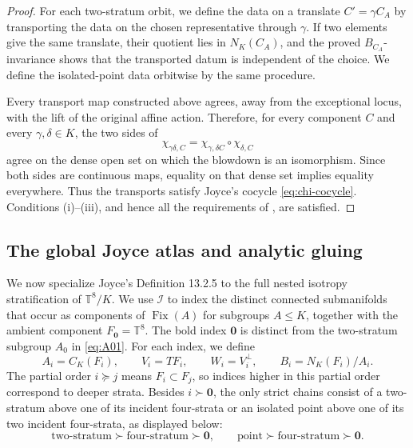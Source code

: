 \documentclass[11pt]{article}
\theoremstyle{remark}\newtheorem{remark}[theorem]{Remark}
\newcommand{\Fix}{\operatorname{Fix}}
\newcommand{\T}{\mathbb T}
\begin{document}
\begin{proof}
For each two-stratum orbit, we define the data on a translate
$C'=\gamma C_A$ by transporting the data on the chosen representative
through $\gamma$.  If two elements give the same translate, their quotient
lies in $N_K(C_A)$, and the proved $B_{C_A}$-invariance shows that the
transported datum is independent of the choice.  We define the
isolated-point data orbitwise by the same procedure.

Every transport map constructed above agrees, away from the exceptional
locus, with the lift of the original affine action.  Therefore, for every
component $C$ and every $\gamma,\delta\in K$, the two sides of
\begin{equation}\label{eq:chi-cocycle}
 \chi_{\gamma\delta,C}
 =\chi_{\gamma,\delta C}\circ\chi_{\delta,C}
\end{equation}
agree on the dense open set on which the blowdown is an isomorphism.  Since
both sides are continuous maps, equality on that dense set implies
equality everywhere.  Thus the transports satisfy Joyce's cocycle
\eqref{eq:chi-cocycle}.  Conditions (i)--(iii), and hence all the
requirements of \cite[Definition 13.2.2]{JoyceBook}, are satisfied.
\end{proof}

\subsection{The global Joyce atlas and analytic gluing}
We now specialize Joyce's Definition 13.2.5 to the full nested isotropy
stratification of $\T^8/K$.  We use $\mathcal I$ to index the distinct connected
submanifolds that occur as components of $\Fix(A)$ for subgroups
$A\leq K$, together with the ambient component
$F_{\mathbf 0}=\T^8$.  The bold index $\mathbf 0$ is distinct from the
two-stratum subgroup $A_0$ in \eqref{eq:A01}.  For each index, we define
\[
 A_i=C_K(F_i),\qquad V_i=T F_i,\qquad W_i=V_i^\perp,
 \qquad B_i=N_K(F_i)/A_i.
\]
The partial order $i\succeq j$ means $F_i\subset F_j$, so indices higher
in this partial order correspond to deeper strata.  Besides
$i\succ\mathbf 0$,
the only strict chains consist of a two-stratum above one of its incident
four-strata or an isolated point above one of its two incident
four-strata, as displayed below:
\[
\text{two-stratum}\succ\text{four-stratum}\succ\mathbf 0,\qquad
\text{point}\succ\text{four-stratum}\succ\mathbf 0.
\]
\end{document}
